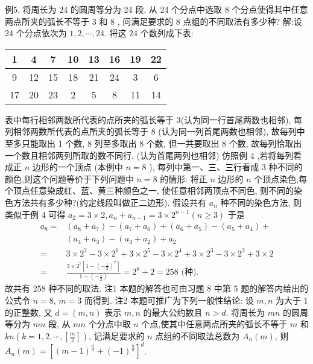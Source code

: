 例5. 将周长为 24 的圆周等分为 24 段, 从 24 个分点中选取 8 个分点使得其中任意两点所夹的弧长不等于 3 和 8 , 问满足要求的 8 点组的不同取法有多少种?
解:设 24 个分点依次为 $1,2, \cdots, 24$. 将这 24 个数列成下表:
\begin{tabular}{|c|c|c|c|c|c|c|c|}
\hline 1 & 4 & 7 & 10 & 13 & 16 & 19 & 22 \\
\hline 9 & 12 & 15 & 18 & 21 & 24 & 3 & 6 \\
\hline 17 & 20 & 23 & 2 & 5 & 8 & 11 & 14 \\
\hline
\end{tabular}
表中每行相邻两数所代表的点所夹的弧长等于 3(认为同一行首尾两数也相邻), 每列相邻两数所代表的点所夹的弧长等于 8 (认为同一列首尾两数也相邻), 故每列中至多只能取出 1 个数, 8 列至多取出 8 个数, 但一共要取出 8 个数, 故每列恰取出一个数且相邻两列所取的数不同行.
(认为首尾两列也相邻)
仿照例 4 ,若将每列看成正 $n$ 边形的一个顶点 (本例中 $n=8$ ), 每列中第一、三、三行看成 3 种不同的颜色,则这个问题等价于下列问题中 $n=8$ 的情形: 将正 $n$ 边形的 $n$ 个顶点染色,每个顶点任意染成红、蓝、黄三种颜色之一, 使任意相邻两顶点不同色, 则不同的染色方法共有多少种?(约定线段叫做正二边形).
假设共有 $a_n$ 种不同的染色方法, 则类似于例 4 可得 $a_2=3 \times 2, a_n+a_{n-1} =3 \times 2^{n-1}(n \geqslant 3)$ 于是
$$
\begin{aligned}
a_8= & \left(a_8+a_7\right)-\left(a_7+a_6\right)+\left(a_6+a_5\right)-\left(a_5+a_4\right)+ \\
& \left(a_4+a_3\right)-\left(a_3+a_2\right)+a_2 \\
= & 3 \times 2^7-3 \times 2^6+3 \times 2^5-3 \times 2^4+3 \times 2^3-3 \times 2^2+3 \times 2 \\
= & \frac{3 \times 2^7\left[1-\left(-\frac{1}{2}\right)^7\right]}{1-\left(-\frac{1}{2}\right)}=2^8+2=258 \text { (种). }
\end{aligned}
$$
故共有 258 种不同的取法.
注1 本题的解答也可由习题 8 中第 5 题的解答内给出的公式令 $n=8$, $m=3$ 而得到.
注2 本题可推广为下列一般性结论:
设 $m, n$ 为大于 1 的正整数, 又 $d=(m, n)$ 表示 $m, n$ 的最大公约数且 $n>d$. 将周长为 $m n$ 的圆周等分为 $m n$ 段, 从 $m n$ 个分点中取 $n$ 个点,使其中任意两点所夹的弧长不等于 $m$ 和 $k n\left(k=1,2, \cdots,\left[\frac{m}{2}\right]\right)$, 记满足要求的 $n$ 点组的不同取法总数为 $A_n(m)$, 则 $A_n(m)=\left[(m-1)^{\frac{n}{d}}+(-1)^{\frac{n}{d}}\right]^d$.




